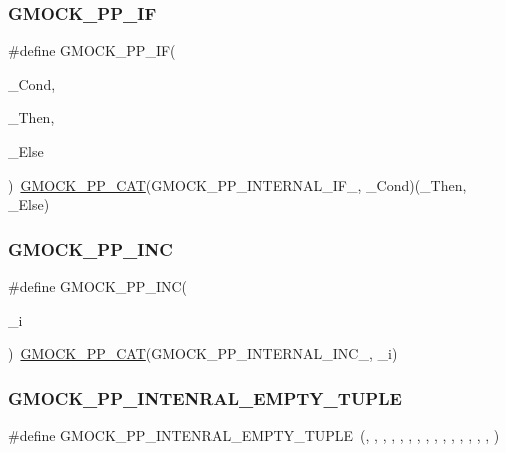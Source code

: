 \subsubsection{\texorpdfstring{GMOCK\_PP\_IF}{GMOCK\_PP\_IF}}
{\footnotesize\ttfamily \#define G\+M\+O\+C\+K\+\_\+\+P\+P\+\_\+\+IF(\begin{DoxyParamCaption}\item[{}]{\+\_\+\+Cond,  }\item[{}]{\+\_\+\+Then,  }\item[{}]{\+\_\+\+Else }\end{DoxyParamCaption})~\mbox{\hyperlink{_obj__test_2lib_2googletest-master_2googlemock_2include_2gmock_2internal_2gmock-pp_8h_a108c52ffa81ab99348d23b8fa76fded3}{G\+M\+O\+C\+K\+\_\+\+P\+P\+\_\+\+C\+AT}}(G\+M\+O\+C\+K\+\_\+\+P\+P\+\_\+\+I\+N\+T\+E\+R\+N\+A\+L\+\_\+\+I\+F\+\_\+, \+\_\+\+Cond)(\+\_\+\+Then, \+\_\+\+Else)}

\mbox{\label{googletest-master_2googlemock_2include_2gmock_2internal_2gmock-pp_8h_abcffb7b948f0eed30aa35ba3c1e77299}} 
\subsubsection{\texorpdfstring{GMOCK\_PP\_INC}{GMOCK\_PP\_INC}}
{\footnotesize\ttfamily \#define G\+M\+O\+C\+K\+\_\+\+P\+P\+\_\+\+I\+NC(\begin{DoxyParamCaption}\item[{}]{\+\_\+i }\end{DoxyParamCaption})~\mbox{\hyperlink{_obj__test_2lib_2googletest-master_2googlemock_2include_2gmock_2internal_2gmock-pp_8h_a108c52ffa81ab99348d23b8fa76fded3}{G\+M\+O\+C\+K\+\_\+\+P\+P\+\_\+\+C\+AT}}(G\+M\+O\+C\+K\+\_\+\+P\+P\+\_\+\+I\+N\+T\+E\+R\+N\+A\+L\+\_\+\+I\+N\+C\+\_\+, \+\_\+i)}

\mbox{\label{googletest-master_2googlemock_2include_2gmock_2internal_2gmock-pp_8h_a7a4a2a8606d20424b0ec1db4236819e4}} 
\subsubsection{\texorpdfstring{GMOCK\_PP\_INTENRAL\_EMPTY\_TUPLE}{GMOCK\_PP\_INTENRAL\_EMPTY\_TUPLE}}
{\footnotesize\ttfamily \#define G\+M\+O\+C\+K\+\_\+\+P\+P\+\_\+\+I\+N\+T\+E\+N\+R\+A\+L\+\_\+\+E\+M\+P\+T\+Y\+\_\+\+T\+U\+P\+LE~(, , , , , , , , , , , , , , , )}

